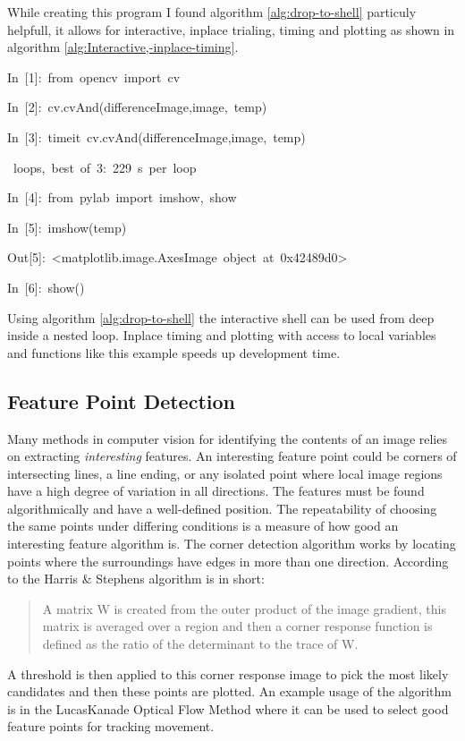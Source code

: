 \documentclass[english]{IEEEtran}
\theoremstyle{plain}
\newenvironment{lyxcode}
{\par\begin{list}{}{
\setlength{\rightmargin}{\leftmargin}
\setlength{\listparindent}{0pt}%
\raggedright
\setlength{\itemsep}{0pt}
\setlength{\parsep}{0pt}
\normalfont\ttfamily}%
 \item[]}
{\end{list}}
\begin{document}
While creating this program I found algorithm \ref{alg:drop-to-shell}
particuly helpfull, it allows for interactive, inplace trialing, timing
and plotting as shown in algorithm \ref{alg:Interactive,-inplace-timing}.

%
\begin{algorithm*}
\begin{lyxcode}
\noindent In~{[}1{]}:~from~opencv~import~cv

\noindent In~{[}2{]}:~cv.cvAnd(differenceImage,image,~temp)

\noindent In~{[}3{]}:~timeit~cv.cvAnd(differenceImage,image,~temp)

~loops,~best~of~3:~229~\textmu{}s~per~loop

\noindent In~{[}4{]}:~from~pylab~import~imshow,~show

\noindent In~{[}5{]}:~imshow(temp)~

\noindent Out{[}5{]}:~<matplotlib.image.AxesImage~object~at~0x42489d0>

\noindent In~{[}6{]}:~show()
\end{lyxcode}
\caption{\label{alg:Interactive,-inplace-timing}Using algorithm \ref{alg:drop-to-shell}
the interactive shell can be used from deep inside a nested loop.
Inplace timing and plotting with access to local variables and functions
like this example speeds up development time.}

\end{algorithm*}



\subsection{Feature Point Detection}

Many methods in computer vision for identifying the contents of an
image relies on extracting \emph{interesting} features. An interesting
feature point could be corners of intersecting lines, a line ending,
or any isolated point where local image regions have a high degree
of variation in all directions\cite{harris1988combined}. The features
must be found algorithmically and have a well-defined position. The
repeatability of choosing the same points under differing conditions
is a measure of how good an interesting feature algorithm is. The
corner detection algorithm works by locating points where the surroundings
have edges in more than one direction. According to \cite{Sol09}
the Harris \& Stephens algorithm is in short: 
\begin{quote}
A matrix W is created from the outer product of the image gradient,
this matrix is averaged over a region and then a corner response function
is defined as the ratio of the determinant to the trace of W.
\end{quote}
A threshold is then applied to this corner response image to pick
the most likely candidates and then these points are plotted. An example
usage of the algorithm is in the Lucas\textendash{}Kanade Optical
Flow Method where it can be used to select good feature points\cite{beauchemin1995computation}
for tracking movement.
\end{document}
